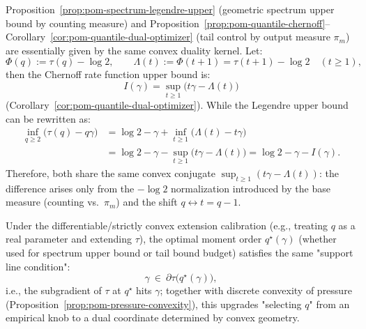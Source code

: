 \begin{remark}\label{rem:pom-legendre-chernoff-same-dual}
Proposition~\ref{prop:pom-spectrum-legendre-upper} (geometric spectrum upper bound by counting measure) and Proposition~\ref{prop:pom-quantile-chernoff}--Corollary~\ref{cor:pom-quantile-dual-optimizer} (tail control by output measure $\pi_m$) are essentially given by the same convex duality kernel.
Let:
\[
\Phi(q):=\tau(q)-\log 2,
\qquad
\Lambda(t):=\Phi(t+1)=\tau(t+1)-\log 2\quad(t\ge 1),
\]
then the Chernoff rate function upper bound is:
\[
I(\gamma)=\sup_{t\ge 1}\bigl(t\gamma-\Lambda(t)\bigr)
\]
(Corollary~\ref{cor:pom-quantile-dual-optimizer}).
While the Legendre upper bound can be rewritten as:
\[
\begin{aligned}
\inf_{q\ge 2}\bigl(\tau(q)-q\gamma\bigr)
&=\log 2-\gamma+\inf_{t\ge 1}\bigl(\Lambda(t)-t\gamma\bigr)\\
&=\log 2-\gamma-\sup_{t\ge 1}\bigl(t\gamma-\Lambda(t)\bigr)
=\log 2-\gamma-I(\gamma).
\end{aligned}
\]
Therefore, both share the same convex conjugate $\sup_{t\ge 1}(t\gamma-\Lambda(t))$: the difference arises only from the $-\log 2$ normalization introduced by the base measure (counting vs.\ $\pi_m$) and the shift $q\leftrightarrow t=q-1$.
\par
Under the differentiable/strictly convex extension calibration (e.g., treating $q$ as a real parameter and extending $\tau$), the optimal moment order $q^\star(\gamma)$ (whether used for spectrum upper bound or tail bound budget) satisfies the same "support line condition":
\[
\gamma\ \in\ \partial \tau\bigl(q^\star(\gamma)\bigr),
\]
i.e., the subgradient of $\tau$ at $q^\star$ hits $\gamma$; together with discrete convexity of pressure (Proposition~\ref{prop:pom-pressure-convexity}), this upgrades "selecting $q$" from an empirical knob to a dual coordinate determined by convex geometry.
\end{remark}

